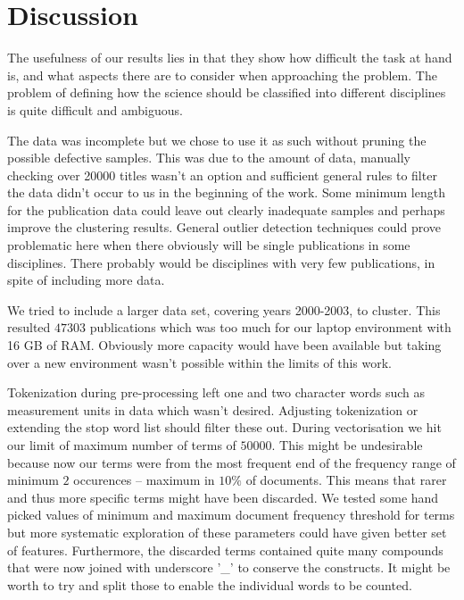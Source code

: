 \chapter{Discussion}
\label{chapter:discussion}

The usefulness of our results lies in that they show how difficult
the task at hand is, and what aspects there are to consider when
approaching the problem.
The problem of defining how the science should be classified into
different disciplines is quite difficult and ambiguous.

The data was incomplete but we chose to use it as such without 
pruning the possible defective samples. This was due to the 
amount of data, manually checking over 20000 titles wasn't an 
option and sufficient general rules to filter the data didn't 
occur to us in the beginning of the work. Some minimum length for 
the publication data could leave out clearly inadequate samples 
and perhaps improve the clustering results. General outlier 
detection techniques \cite{hodge_survey_2004} could prove 
problematic here when there obviously will be single publications 
in some disciplines. There probably would be disciplines with very
few publications, in spite of including more data.

We tried to include a larger data set, covering years 2000-2003, 
to cluster. This resulted $47303$ publications which was too much 
for our laptop environment with 16 GB of RAM. Obviously more 
capacity would have been available but taking over a new 
environment wasn't possible within the limits of this work.

Tokenization during pre-processing left one and two character 
words such as measurement units in data which wasn't desired. 
Adjusting tokenization or extending the stop word list should 
filter these out.
During vectorisation we hit our limit of maximum number of terms 
of $50000$. This might be undesirable because now our terms were
from the most frequent end of the frequency range of minimum $2$ 
occurences -- maximum in $10 \%$ of documents. This means that 
rarer and thus more specific terms might have been discarded.
We tested some hand picked values of minimum and maximum document 
frequency threshold for terms but more systematic exploration of 
these parameters could have given better set of features.
Furthermore, the discarded terms contained quite many compounds 
that were now joined with underscore '\_' to conserve the 
constructs. It might be worth to try and split those to enable the 
individual words to be counted.

